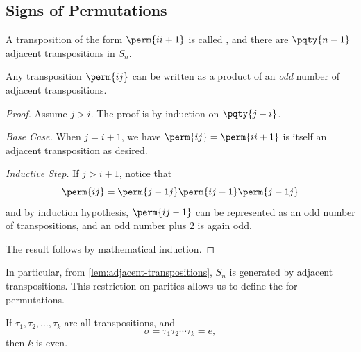 \subsection{Signs of Permutations}
\label{sec:signs-of-permutations}

A transposition of the form \(\perm{i {i + 1}}\) is called , and there are \(\pqty{n - 1}\) adjacent transpositions in \(S_n\).

\begin{lemma}
    \label{lem:adjacent-transpositions}%
    Any transposition \(\perm{ij}\) can be written as a product of an \emph{odd} number of adjacent transpositions.
\end{lemma}

\begin{proof}
    Assume \(j > i\). The proof is by induction on \(\pqty{j - i}\).
    
    \emph{Base Case.} When \(j = i + 1\), we have \(\perm{ij} = \perm{i {i + 1}}\) is itself an adjacent transposition as desired.

    \emph{Inductive Step.} If \(j > i + 1\), notice that
    \[
        \perm{i j} = \perm{{j - 1} j} \perm{i {j - 1}} \perm{{j - 1} j}
    \]
    and by induction hypothesis, \(\perm{i j - 1}\) can be represented as an odd number of transpositions, and an odd number plus \(2\) is again odd.

    The result follows by mathematical induction.
\end{proof}

In particular, from \autoref{lem:adjacent-transpositions}, \(S_n\) is generated by adjacent transpositions. This restriction on parities allows us to define the  for permutations.

\begin{lemma}
    \label{lem:identity-permutation-is-even}%
    If \(\tau_1, \tau_2, \ldots, \tau_k\) are all transpositions, and
    \[
        \sigma = \tau_1 \tau_2 \cdots \tau_k = e,
    \]
    then \(k\) is even.
\end{lemma}

